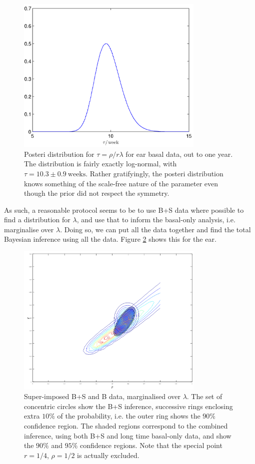 \documentclass[10pt,english]{article}
\begin{document}
\begin{figure}[htb]
	\centering
	\includegraphics[width=0.8\textwidth]{AB/ear-eyp-b-tau.png}
	\caption{\label{fig:ear_eyp_b_tau}Posteri distribution for $\tau = \rho/r\lambda$ for ear basal data, out to one year. The distribution is fairly exactly log-normal, with $\tau = 10.3 \pm 0.9~\textrm{weeks}$. Rather gratifyingly, the posteri distribution knows something of the scale-free nature of the parameter even though the prior did not respect the symmetry.}
\end{figure}

As such, a reasonable protocol seems to be to use B+S data where possible to find a distribution for $\lambda$, and use that to inform the basal-only analysis, i.e. marginalise over $\lambda$. Doing so, we can put all the data together and find the total Bayesian inference using all the data. Figure \ref{fig:ear-eyp-combined} shows this for the ear.

\begin{figure}[htb]
	\centering
	\includegraphics[width=0.8\textwidth]{ear-combined-projected-lambda.png}
	\caption{\label{fig:ear-eyp-combined}Super-imposed B+S and B data, marginalised over $\lambda$. The set of concentric circles show the B+S inference, successive rings enclosing extra $10\%$ of the probability, i.e. the outer ring shows the $90\%$ confidence region. The shaded regions correspond to the combined inference, using both B+S and long time basal-only data, and show the $90\%$ and $95\%$ confidence regions. Note that the special point $r=1/4$, $\rho=1/2$ is actually excluded.}
\end{figure}
\end{document}
